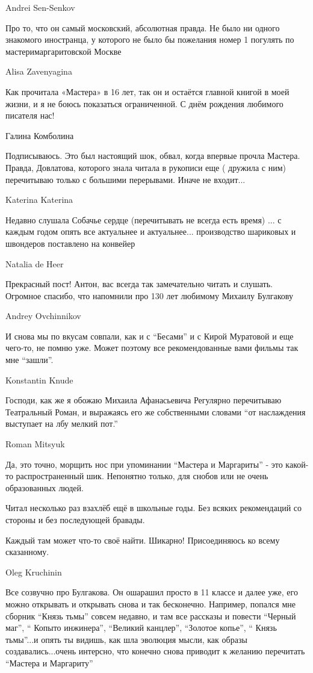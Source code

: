 Andrei Sen-Senkov

Про то, что он самый московский, абсолютная правда. Не было ни одного знакомого
иностранца, у которого не было бы пожелания номер 1 погулять по
мастеримаргаритовской Москве

Alisa Zavenyagina

Как прочитала «Мастера» в 16 лет, так он и остаётся главной книгой в моей
жизни, и я не боюсь показаться ограниченной. С днём рождения любимого писателя
нас!

Галина Комболина

Подписываюсь. Это был настоящий шок, обвал, когда впервые прочла Мастера.
Правда, Довлатова, которого знала читала в рукописи еще ( дружила с ним)
перечитываю только с большими перерывами. Иначе не входит...

Katerina Katerina

Недавно слушала Собачье сердце (перечитывать не всегда есть время) ... с каждым
годом опять все актуальнее и актуальнее... производство шариковых и швондеров
поставлено на конвейер

Natalia de Heer

Прекрасный пост! Антон, вас всегда так замечательно читать и слушать. Огромное
спасибо, что напомнили про 130 лет любимому Михаилу Булгакову

Andrey Ovchinnikov

И снова мы по вкусам совпали, как и с \enquote{Бесами} и с Кирой Муратовой и еще
чего-то, не помню уже. Может поэтому все рекомендованные вами фильмы так мне
\enquote{зашли}.

Konstantin Knude

Господи, как же я обожаю Михаила Афанасьевича Регулярно перечитываю
Театральный Роман, и выражаясь его же собственными словами \enquote{от наслаждения
выступает на лбу мелкий пот.}

Roman Mitsyuk

Да, это точно, морщить нос при упоминании \enquote{Мастера и Маргариты} - это какой-то
распространенный шик. Непонятно только, для снобов или не очень образованных
людей.

Читал несколько раз взахлёб ещё в школьные годы. Без всяких рекомендаций со стороны и без последующей бравады.

Каждый там может что-то своё найти. Шикарно! Присоединяюсь ко всему сказанному.

Oleg Kruchinin

Все созвучно про Булгакова. Он ошарашил просто в 11 классе и далее уже, его
можно открывать и открывать снова и так бесконечно. Например, попался мне
сборник \enquote{Князь тьмы} совсем недавно, и там все рассказы и повести \enquote{Черный маг},
\enquote{ Копыто инжинера}, \enquote{Великий канцлер}, \enquote{Золотое копье}, \enquote{ Князь тьмы}...и опять
ты видишь, как шла эволюция мысли, как образы создавались...очень интерсно, что
конечно снова приводит к желанию перечитать \enquote{Мастера и Маргариту}

